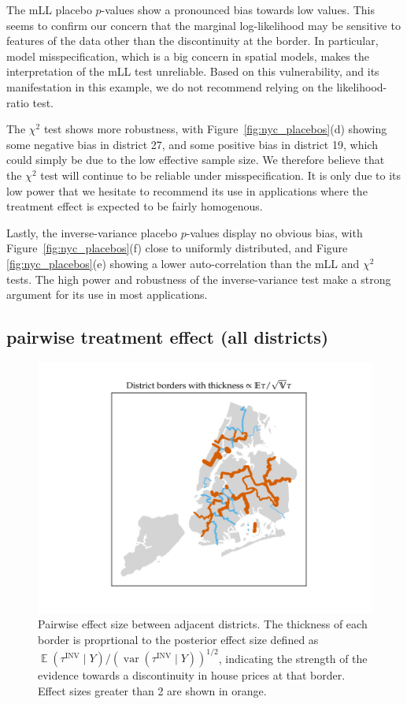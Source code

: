 \documentclass[letter]{article}
\makeatletter
\def\maxwidth{\ifdim\Gin@nat@width>\linewidth\linewidth
\else\Gin@nat@width\fi}
\let\Oldincludegraphics\includegraphics
\renewcommand{\includegraphics}[1]{\Oldincludegraphics[width=1.0\maxwidth]{#1}}
\DeclareMathOperator{\E}{\mathbb{E}}
\DeclareMathOperator{\var}{{var}}
\newcommand{\invvar}{\tau^{\mathrm{INV}}}
\makeatother
\begin{document}
    	The mLL placebo \(p\)-values show a pronounced bias towards low values.
This seems to confirm our concern that the marginal log-likelihood may be sensitive to features of the data other than the discontinuity at the border.
In particular, model misspecification, which is a big concern in spatial models, makes the interpretation of the mLL test unreliable.
Based on this vulnerability, and its manifestation in this example, we do not recommend relying on the likelihood-ratio test.

The \(\chi^2\) test shows more robustness, with Figure~\ref{fig:nyc_placebos}(d) showing some negative bias in district 27, and some positive bias in district 19, which could simply be due to the low effective sample size.
We therefore believe that the \(\chi^2\) test will continue to be reliable under misspecification.
It is only due to its low power that we hesitate to recommend its use in applications where the treatment effect is expected to be fairly homogenous.

Lastly, the inverse-variance placebo \(p\)-values display no obvious bias, with Figure~\ref{fig:nyc_placebos}(f) close to uniformly distributed, and Figure~ \ref{fig:nyc_placebos}(e) showing a lower auto-correlation than the mLL and \(\chi^2\) tests.
The high power and robustness of the inverse-variance test make a strong argument for its use in most applications.
    


    	\subsection{pairwise treatment effect (all districts)}\label{pairwise-treatment-effect-all-districts}

\begin{figure}
\centering
\includegraphics{../NYC/NYC_plots/pairwise_multi.png}
\caption{\label{fig:NYC_pairwise} Pairwise effect size between adjacent districts. The thickness of each border is proprtional to the posterior effect size defined as \(\E(\invvar \mid Y) \big/ (\var(\invvar \mid Y))^{1/2}\), indicating the strength of the evidence towards a discontinuity in house prices at that border. Effect sizes greater than 2 are shown in orange.}
\end{figure}
    
\end{document}
